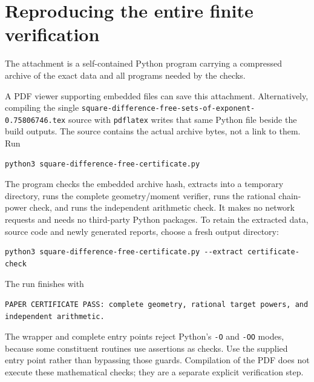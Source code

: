 \documentclass[11pt]{article}
\theoremstyle{definition}
\theoremstyle{remark}
\begin{document}
\section{Reproducing the entire finite verification}\label{app:reproduction}
The attachment is a self-contained Python program carrying a compressed
archive of the exact data and all programs needed by the checks.
\begin{center}
\end{center}
A PDF viewer supporting embedded files can save this attachment.
Alternatively, compiling the single \texttt{square-difference-free-sets-of-exponent-0.75806746.tex}
source with \texttt{pdflatex} writes that same Python file beside the build
outputs. The source contains the actual archive bytes, not a link to them.
Run
\begin{lstlisting}
python3 square-difference-free-certificate.py
\end{lstlisting}
The program checks the embedded archive hash, extracts into a temporary
directory, runs the complete geometry/moment verifier, runs the rational
chain-power check, and runs the independent arithmetic check. It makes no
network requests and needs no third-party Python packages. To retain the
extracted data, source code and newly generated reports, choose a fresh
output directory:
\begin{lstlisting}
python3 square-difference-free-certificate.py --extract certificate-check
\end{lstlisting}
The run finishes with
\begin{lstlisting}
PAPER CERTIFICATE PASS: complete geometry, rational target powers, and independent arithmetic.
\end{lstlisting}
The wrapper and complete entry points reject Python's \texttt{-O} and
\texttt{-OO} modes, because some constituent routines use assertions as
checks. Use the supplied entry point rather than bypassing those guards.
Compilation of the PDF does not execute these mathematical checks; they
are a separate explicit verification step.
\end{document}

